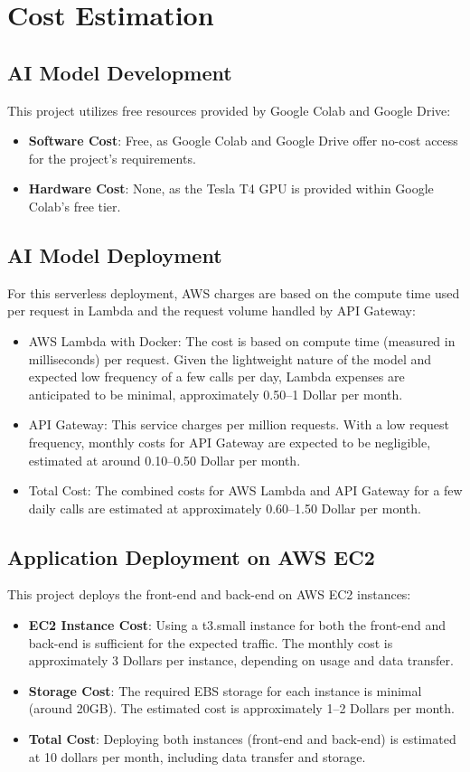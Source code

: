\documentclass[conference]{IEEEtran}
\begin{document}
\section{Cost Estimation}
\subsection{AI Model Development}
This project utilizes free resources provided by Google Colab and Google Drive:
\begin{itemize}
    \item \textbf{Software Cost}: Free, as Google Colab and Google Drive offer no-cost access for the project’s requirements.
    \item \textbf{Hardware Cost}: None, as the Tesla T4 GPU is provided within Google Colab’s free tier.
\end{itemize}

\subsection{AI Model Deployment} 
For this serverless deployment, AWS charges are based on the compute time used per request in Lambda and the request volume handled by API Gateway: 
\begin{itemize} 
    \item AWS Lambda with Docker: The cost is based on compute time (measured in milliseconds) per request. Given the lightweight nature of the model and expected low frequency of a few calls per day, Lambda expenses are anticipated to be minimal, approximately 0.50–1 Dollar per month. 
    \item API Gateway: This service charges per million requests. With a low request frequency, monthly costs for API Gateway are expected to be negligible, estimated at around 0.10–0.50 Dollar per month. 
    \item Total Cost: The combined costs for AWS Lambda and API Gateway for a few daily calls are estimated at approximately 0.60–1.50 Dollar per month. 
\end{itemize}

\subsection{Application Deployment on AWS EC2}
This project deploys the front-end and back-end on AWS EC2 instances:
\begin{itemize}
    \item \textbf{EC2 Instance Cost}: Using a t3.small instance for both the front-end and back-end is sufficient for the expected traffic. The monthly cost is approximately 3 Dollars per instance, depending on usage and data transfer.
    \item \textbf{Storage Cost}: The required EBS storage for each instance is minimal (around 20GB). The estimated cost is approximately 1–2 Dollars per month.
    \item \textbf{Total Cost}: Deploying both instances (front-end and back-end) is estimated at 10 dollars per month, including data transfer and storage.
\end{itemize}
\end{document}
